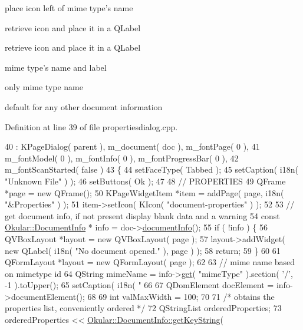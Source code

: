 place icon left of mime type's name

retrieve icon and place it in a Q\+Label

retrieve icon and place it in a Q\+Label

mime type's name and label

only mime type name

default for any other document information 

Definition at line 39 of file propertiesdialog.\+cpp.


\begin{DoxyCode}
40     : KPageDialog( parent ), m\_document( doc ), m\_fontPage( 0 ),
41       m\_fontModel( 0 ), m\_fontInfo( 0 ), m\_fontProgressBar( 0 ),
42       m\_fontScanStarted( \textcolor{keyword}{false} )
43 \{
44   setFaceType( Tabbed );
45   setCaption( i18n( \textcolor{stringliteral}{"Unknown File"} ) );
46   setButtons( Ok );
47 
48   \textcolor{comment}{// PROPERTIES}
49   QFrame *page = \textcolor{keyword}{new} QFrame();
50   KPageWidgetItem *item = addPage( page, i18n( \textcolor{stringliteral}{"&Properties"} ) );
51   item->setIcon( KIcon( \textcolor{stringliteral}{"document-properties"} ) );
52 
53   \textcolor{comment}{// get document info, if not present display blank data and a warning}
54   \textcolor{keyword}{const} \hyperlink{classOkular_1_1DocumentInfo}{Okular::DocumentInfo} * info = doc->\hyperlink{classOkular_1_1Document_a9c0b854496aa923bd575593a299af7e4}{documentInfo}();
55   \textcolor{keywordflow}{if} ( !info ) \{
56     QVBoxLayout *layout = \textcolor{keyword}{new} QVBoxLayout( page );
57     layout->addWidget( \textcolor{keyword}{new} QLabel( i18n( \textcolor{stringliteral}{"No document opened."} ), page ) );
58     \textcolor{keywordflow}{return};
59   \}
60 
61   QFormLayout *layout = \textcolor{keyword}{new} QFormLayout( page );
62 
63   \textcolor{comment}{// mime name based on mimetype id}
64   QString mimeName = info->\hyperlink{classOkular_1_1DocumentInfo_a568ea22f19b034255be4c19f55ab1d82}{get}( \textcolor{stringliteral}{"mimeType"} ).section( \textcolor{charliteral}{'/'}, -1 ).toUpper();
65   setCaption( i18n( \textcolor{stringliteral}{"%
66 
67   QDomElement docElement = info->documentElement();
68 
69   \textcolor{keywordtype}{int} valMaxWidth = 100;
70 
71   \textcolor{comment}{/* obtains the properties list, conveniently ordered */}
72   QStringList orderedProperties;
73   orderedProperties << \hyperlink{classOkular_1_1DocumentInfo_a70cb5aa15e85e1690c7793ee9f4832b2}{Okular::DocumentInfo::getKeyString}( 
}
\end{DoxyCode}
